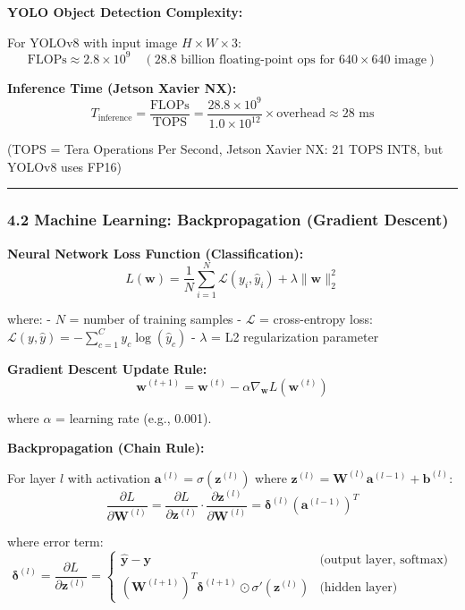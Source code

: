 \documentclass[
]{article}
\begin{document}
\textbf{YOLO Object Detection Complexity:}

For YOLOv8 with input image \(H \times W \times 3\): \[
\text{FLOPs} \approx 2.8 \times 10^9 \quad (\text{28.8 billion floating-point ops for } 640 \times 640 \text{ image})
\]

\textbf{Inference Time (Jetson Xavier NX):} \[
T_{\text{inference}} = \frac{\text{FLOPs}}{\text{TOPS}} = \frac{28.8 \times 10^9}{1.0 \times 10^{12}} \times \text{overhead} \approx 28 \text{ ms}
\]

(TOPS = Tera Operations Per Second, Jetson Xavier NX: 21 TOPS INT8, but
YOLOv8 uses FP16)

\begin{center}\rule{0.5\linewidth}{0.5pt}\end{center}

\hypertarget{machine-learning-backpropagation-gradient-descent}{%
\subsubsection{4.2 Machine Learning: Backpropagation (Gradient
Descent)}\label{machine-learning-backpropagation-gradient-descent}}

\textbf{Neural Network Loss Function (Classification):} \[
L(\mathbf{w}) = \frac{1}{N} \sum_{i=1}^N \mathcal{L}(y_i, \hat{y}_i) + \lambda \|\mathbf{w}\|_2^2
\]

where: - \(N\) = number of training samples - \(\mathcal{L}\) =
cross-entropy loss:
\(\mathcal{L}(y, \hat{y}) = -\sum_{c=1}^C y_c \log(\hat{y}_c)\) -
\(\lambda\) = L2 regularization parameter

\textbf{Gradient Descent Update Rule:} \[
\mathbf{w}^{(t+1)} = \mathbf{w}^{(t)} - \alpha \nabla_{\mathbf{w}} L(\mathbf{w}^{(t)})
\]

where \(\alpha\) = learning rate (e.g., 0.001).

\textbf{Backpropagation (Chain Rule):}

For layer \(l\) with activation
\(\mathbf{a}^{(l)} = \sigma(\mathbf{z}^{(l)})\) where
\(\mathbf{z}^{(l)} = \mathbf{W}^{(l)} \mathbf{a}^{(l-1)} + \mathbf{b}^{(l)}\):
\[
\frac{\partial L}{\partial \mathbf{W}^{(l)}} = \frac{\partial L}{\partial \mathbf{z}^{(l)}} \cdot \frac{\partial \mathbf{z}^{(l)}}{\partial \mathbf{W}^{(l)}} = \boldsymbol{\delta}^{(l)} (\mathbf{a}^{(l-1)})^T
\]

where error term: \[
\boldsymbol{\delta}^{(l)} = \frac{\partial L}{\partial \mathbf{z}^{(l)}} =
\begin{cases}
\hat{\mathbf{y}} - \mathbf{y} & \text{(output layer, softmax)} \\
(\mathbf{W}^{(l+1)})^T \boldsymbol{\delta}^{(l+1)} \odot \sigma'(\mathbf{z}^{(l)}) & \text{(hidden layer)}
\end{cases}
\]
\end{document}
